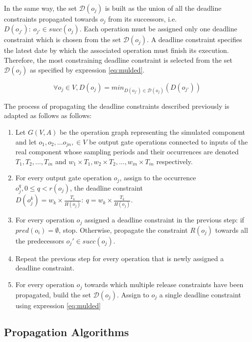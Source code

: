 In the same way, the set $\mathcal{D}(o_j)$ is built as the union of all the deadline constraints propagated towards $o_j$ from its successors, i.e. $D(o_{j'}):\ o_{j'} \in succ(o_j)$. Each operation must be assigned only one deadline constraint which is chosen from the set $\mathcal{D}(o_j)$. A deadline constraint specifies the latest date by which the associated operation must finish its execution. Therefore, the most constraining deadline constraint is selected from the set $\mathcal{D}(o_j)$ as specified by expression \ref{eq:mulded}.

\begin{equation}
\forall o_j \in V, D(o_j) = min_{D(o_{j'}) \in \mathcal{D}(o_j) }(D(o_{j'}))
\label{eq:mulded}
\end{equation}

The process of propagating the deadline constraints described previously is adapted as follows as follows:

\begin{enumerate}
\item Let $G(V,A)$ be the operation graph representing the simulated component and let $o_{1}, o_{2}, \ldots o_{jn},\in  V$ be output gate operations connected to inputs of the real component whose sampling periods and their occurrences are denoted $T_{1}, T_{2}, \ldots, T_{in}$ and $w_1 \times T_1, w_2 \times T_2, \ldots, w_{in} \times T_{in}$ respectively.
\item For every output gate operation $o_{j}$, assign to the occurrence $o_{j}^{q}, 0 \leq q < r(o_{j})$, the deadline constraint $D(o_{j}^{k}) = w_k \times \frac{T_{k}}{H(o_{j})}:\ q = w_k \times \frac{T_{k}}{H(o_{j})}$.
\item For every operation $o_j$ assigned a deadline constraint in the previous step: if $pred(o_i) = \emptyset$, stop. Otherwise, propagate the constraint $R(o_j)$ towards all the predecessors $o_j' \in succ(o_j)$.
\item Repeat the previous step for every operation that is newly assigned a deadline constraint.
\item For every operation $o_j$ towards which multiple release constraints have been propagated, build the set $\mathcal{D}(o_j)$. Assign to $o_j$ a single deadline constraint using expression \ref{eq:mulded}
\end{enumerate}

\subsection{Propagation Algorithms}

